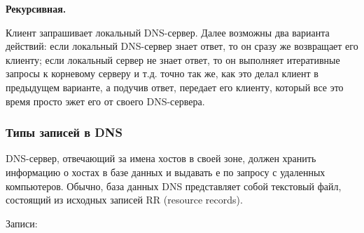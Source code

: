 \documentclass[a4paper,12pt]{article}
\begin{document}
	{\bf Рекурсивная.}
	
	Клиент запрашивает локальный DNS-сервер. Далее возможны два варианта действий: если локальный DNS-сервер знает ответ, то он сразу же возвращает его клиенту; если локальный сервер не знает ответ, то он выполняет итеративные запросы к корневому серверу и т.д. точно так же, как это делал клиент в предыдущем варианте, а подучив ответ, передает его клиенту, который все это время просто эжет его от своего DNS-сервера.
	
	\subsubsection{Типы записей в DNS}
	
	DNS-сервер, отвечающий за имена хостов в своей зоне, должен хранить информацию о хостах в базе данных и выдавать е по запросу с удаленных компьютеров. Обычно, база данных DNS представляет собой текстовый файл, состоящий из исходных записей RR (resource records).
	
	Записи:
	
\end{document}
